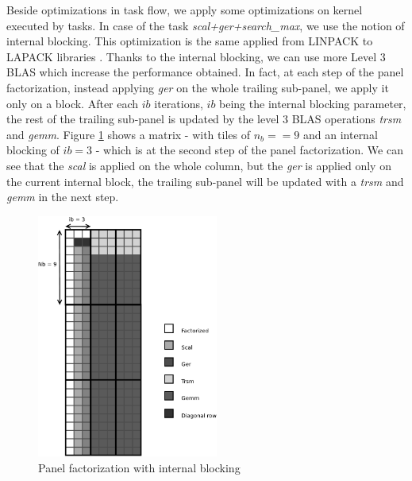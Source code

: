 Beside optimizations in task flow, we apply some optimizations on kernel executed by tasks. In case of the task \textit{scal+ger+search\_max}, we use the notion of internal blocking. This optimization is the same applied from LINPACK to LAPACK libraries \cite{Anderson:1990:LPL}. Thanks to the internal blocking, we can use more Level 3 BLAS which increase the performance obtained. In fact, at each step of the panel factorization, instead applying \emph{ger} on the whole trailing sub-panel, we apply it only on a block. After each $ib$ iterations, $ib$ being the internal blocking parameter, the rest of the trailing sub-panel is updated by the level 3 BLAS operations \emph{trsm} and \emph{gemm}. Figure \ref{fig:panel_ib} shows a matrix - with tiles of $n_b==9$ and an internal blocking of $ib=3$ - which is at the second step of the panel factorization. We can see that the \emph{scal} is applied on the whole column, but the \emph{ger} is applied only on the current internal block, the trailing sub-panel will be updated with a \emph{trsm} and \emph{gemm} in the next step.

\begin{figure}[!ht]
\centering
\includegraphics[height=8cm]{figures/panel_ib_bw.pdf}
\caption{Panel factorization with internal blocking\label{fig:panel_ib}}
\end{figure}
